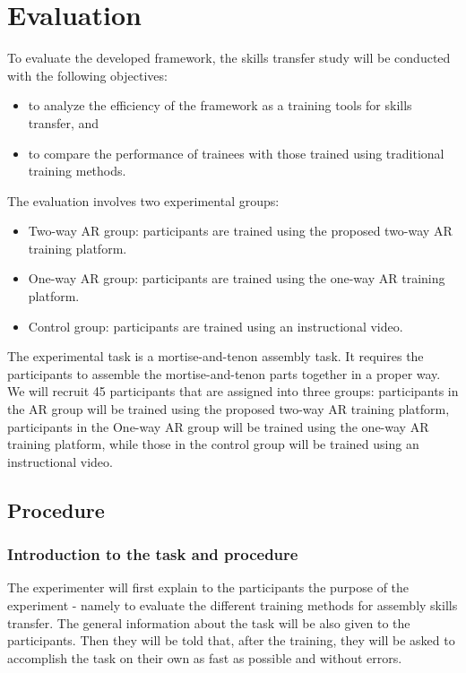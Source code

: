 \chapter{Evaluation}
\label{chap:e}

To evaluate the developed framework, the skills transfer study will be conducted with the following objectives:

\begin{itemize}
	\item
	to analyze the efficiency of the framework as a training tools for skills transfer, and
	\item
	to compare the performance of trainees with those trained using traditional training methods.
\end{itemize}

The evaluation involves two experimental groups:

\begin{itemize}
	\item
	Two-way AR group: participants are trained using the proposed two-way AR training platform.
	\item
	One-way AR group: participants are trained using the one-way AR training platform.
	\item
	Control group: participants are trained using an instructional video.
\end{itemize}

The experimental task is a mortise-and-tenon assembly task. It requires the participants to assemble the mortise-and-tenon parts together in a proper way. We will recruit 45 participants that are assigned into three groups: participants in the AR group will be trained using the proposed two-way AR training platform, participants in the One-way AR group will be trained using the one-way AR training platform, while those in the control group will be trained using an instructional video.

\section{Procedure}

\subsection{Introduction to the task and procedure}

The experimenter will first explain to the participants the purpose of the experiment - namely to evaluate the different training methods for assembly skills transfer.
The general information about the task will be also given to the participants.
Then they will be told that, after the training, they will be asked to accomplish the task on their own as fast as possible and without errors.

